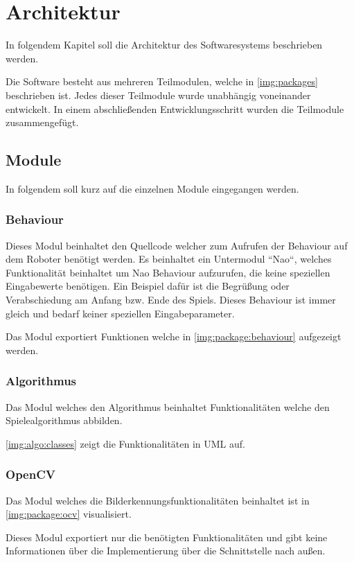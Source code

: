 \chapter{Architektur}

    In folgendem Kapitel soll die Architektur des Softwaresystems beschrieben
    werden.

    Die Software besteht aus mehreren Teilmodulen, welche in
    \autoref{img:packages} beschrieben ist.
    Jedes dieser Teilmodule wurde unabhängig voneinander entwickelt. In einem
    abschließenden Entwicklungsschritt wurden die Teilmodule zusammengefügt.

    \section{Module}

        In folgendem soll kurz auf die einzelnen Module eingegangen werden.

        \subsection{Behaviour}

            Dieses Modul beinhaltet den Quellcode welcher zum Aufrufen der
            Behaviour auf dem Roboter benötigt werden.
            Es beinhaltet ein Untermodul ``Nao``, welches Funktionalität
            beinhaltet um Nao Behaviour aufzurufen, die keine speziellen
            Eingabewerte benötigen.
            Ein Beispiel dafür ist die Begrüßung oder Verabschiedung am Anfang
            bzw. Ende des Spiels.
            Dieses Behaviour ist immer gleich und bedarf keiner speziellen
            Eingabeparameter.

            Das Modul exportiert Funktionen welche in
            \autoref{img:package:behaviour} aufgezeigt werden.

        \subsection{Algorithmus}

            Das Modul welches den Algorithmus beinhaltet Funktionalitäten welche
            den Spielealgorithmus abbilden.

            \autoref{img:algo:classes} zeigt die Funktionalitäten in UML auf.

        \subsection{OpenCV}

            Das Modul welches die Bilderkennungsfunktionalitäten beinhaltet ist
            in \autoref{img:package:ocv} visualisiert.

            Dieses Modul exportiert nur die benötigten Funktionalitäten und gibt
            keine Informationen über die Implementierung über die Schnittstelle
            nach außen.

